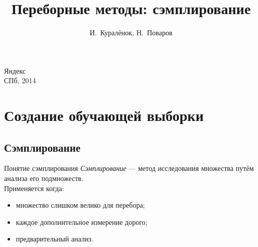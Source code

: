 \documentclass[14pt, fleqn, xcolor={dvipsnames, table}]{beamer}
\title{Переборные методы: сэмплирование\\\small{}}
\author[]{\small{%
И.~Куралёнок,
Н.~Поваров}}
\date{}
\begin{document}
\begin{frame}
\maketitle
\small
\begin{center}
\vspace{-60pt}
\normalsize {\color{red}Я}ндекс \\
\vspace{80pt}
\footnotesize СПб, 2014
\end{center}
\end{frame}


\section{Создание обучающей выборки}

\subsection{Сэмплирование}
\begin{frame}{Понятие сэмплирования}
\textit{Сэмплирование} --- метод исследования множества путём анализа его подмножеств. \\
Применяется когда:
\begin{itemize}
   \item множество слишком велико для перебора;
   \item каждое дополнительное измерение дорого;
   \item предварительный анализ.
\end{itemize}
\end{frame}
\end{document}

